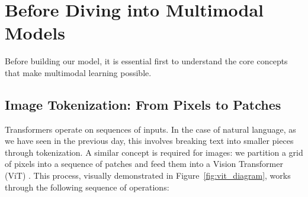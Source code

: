 \section{Before Diving into Multimodal Models}
Before building our model, it is essential first to understand the core concepts that make multimodal learning possible.

\subsection{Image Tokenization: From Pixels to Patches}
\label{subsec:vit_stuff}
Transformers operate on sequences of inputs. In the case of natural language, as we have seen in the previous day, this involves breaking text into smaller pieces through tokenization. A similar concept is required for images: we partition a grid of pixels into a sequence of patches and feed them into a Vision Transformer (ViT) \cite{vit_multimodal_day}. This process, visually demonstrated in Figure~\ref{fig:vit_diagram}, works through the following sequence of operations:
